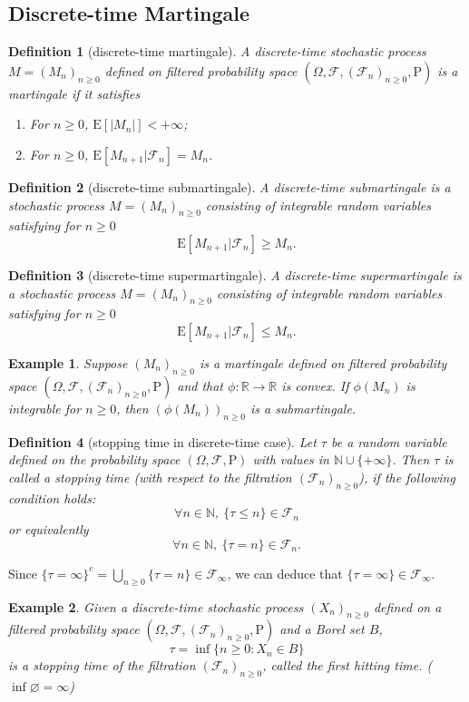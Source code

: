 \documentclass{article}
\newtheorem{definition}{Definition}[section]
\newtheorem{example}{Example}[section]
\theoremstyle{nonumberplain}
\begin{document}
\subsection{Discrete-time Martingale}
\begin{definition}[discrete-time martingale]
	A discrete-time stochastic process $M=(M_n)_{n\ge 0}$ defined on filtered probability space $(\Omega,\mathcal{F},(\mathcal{F}_{n})_{n\ge0},\mathrm{P})$ is a \emph{martingale} if it satisfies
	\begin{enumerate}
		\item For $n\ge0$, $\mathrm{E}[|M_n|]<+\infty$;
		\item For $n\ge0$, $\mathrm{E}[M_{n+1}|\mathcal{F}_n]=M_n$.
	\end{enumerate}
\end{definition}
\begin{definition}[discrete-time submartingale]
A discrete-time \emph{submartingale} is a stochastic process $M=(M_n)_{n\ge 0}$ consisting of integrable random variables satisfying for $n\ge0$
\[
\mathrm{E}[M_{n+1}|\mathcal{F}_n]\ge M_n.
\]
\end{definition}
\begin{definition}[discrete-time supermartingale]
	A discrete-time \emph{supermartingale} is a stochastic process $M=(M_n)_{n\ge 0}$ consisting of integrable random variables satisfying for $n\ge0$
	\[
	\mathrm{E}[M_{n+1}|\mathcal{F}_n]\le M_n.
	\]
\end{definition}

\begin{example}
	Suppose $(M_n)_{n\ge 0}$ is a martingale defined on filtered probability space $(\Omega,\mathcal{F},(\mathcal{F}_{n})_{n\ge0},\mathrm{P})$ and that $\phi:\mathbb{R}\to\mathbb{R}$ is convex. If $\phi(M_n)$ is integrable for $n\ge0$, then $\left(\phi(M_n)\right)_{n\ge 0}$ is a submartingale.
\end{example}

\begin{definition}[stopping time in discrete-time case]
	Let $\tau$  be a random variable defined on the probability space $(\Omega,\mathcal{F},\mathrm{P})$ with values in $\mathbb{N}\cup\{+\infty\}$. Then $\tau$ is called a stopping time (with respect to the filtration $(\mathcal{F}_{n})_{n\ge 0}$), if the following condition holds:
	\[
	\forall n\in\mathbb{N},\ \{\tau \le n\}\in {\mathcal {F}}_{n}
	\]
	or equivalently
	\[
	\forall n\in\mathbb{N},\ \{\tau =n\}\in {\mathcal {F}}_{n}.
	\]
\end{definition}
Since $\{\tau=\infty\}^{c}=\bigcup\limits_{n\ge0}\{\tau=n\} \in \mathcal{F}_{\infty}$, we can deduce that $\{\tau=\infty\}\in \mathcal{F}_{\infty}$.
\begin{example}
	Given a discrete-time stochastic process $(X_{n})_{n\ge 0}$ defined on a filtered probability space $(\Omega,\mathcal{F},(\mathcal{F}_{n})_{n\ge0 },\mathrm{P})$ and a Borel set $B$,
	\[
	\tau=\inf\{n\ge0:X_n\in B\}
	\]
	is a stopping time of the filtration $(\mathcal{F}_{n})_{n\ge0 }$, called the \emph{first hitting time}. ($\inf\varnothing = \infty $)
\end{example}
\end{document}
